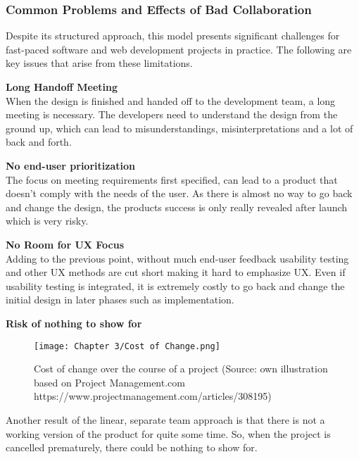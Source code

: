 \subsubsection{Common Problems and Effects of Bad Collaboration}
Despite its structured approach, this model presents significant challenges for fast-paced software
and web development projects in practice. The following are key issues that arise from these
limitations.

\textbf{Long Handoff Meeting} \\
When the design is finished and handed off to the development team, a long meeting is necessary. The
developers need to understand the design from the ground up, which can lead to misunderstandings,
misinterpretations and a lot of back and forth.

\textbf{No end-user prioritization} \\
The focus on meeting requirements first specified, can lead to a product that doesn't comply with
the needs of the user. As there is almost no way to go back and change the design, the products
success is only really revealed after launch which is very risky.

\textbf{No Room for UX Focus} \\
Adding to the previous point, without much end-user feedback usability testing and other UX methods
are cut short making it hard to emphasize UX. Even if usability testing is integrated, it is
extremely costly to go back and change the initial design in later phases such as
implementation.

\textbf{Risk of nothing to show for} \\
\begin{figure}[H]
      \centering
      \texttt{[image: Chapter 3/Cost of Change.png]}
      \caption{Cost of change over the course of a project (Source: own illustration based on Project Management.com https://www.projectmanagement.com/articles/308195)}
\end{figure}
Another result of the linear, separate team approach is that there is not a working version of the
product for quite some time. So, when the project is cancelled prematurely, there could be nothing
to show for. 
